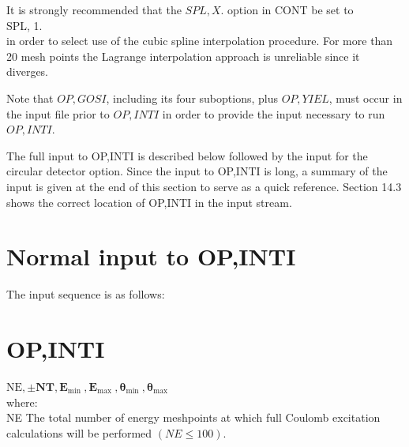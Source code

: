 \documentclass[10pt]{article}
\begin{document}
It is strongly recommended that the $S P L, X$. option in CONT be set to\\
SPL, 1.\\
in order to select use of the cubic spline interpolation procedure. For more than 20 mesh points the Lagrange interpolation approach is unreliable since it diverges.

Note that $O P, G O S I$, including its four suboptions, plus $O P, Y I E L$, must occur in the input file prior to $O P, I N T I$ in order to provide the input necessary to run $O P, I N T I$.

The full input to OP,INTI is described below followed by the input for the circular detector option. Since the input to OP,INTI is long, a summary of the input is given at the end of this section to serve as a quick reference. Section 14.3 shows the correct location of OP,INTI in the input stream.

\section*{Normal input to OP,INTI}
The input sequence is as follows:

\section*{OP,INTI}
$\mathrm{NE}, \pm \mathbf{N T}, \mathbf{E}_{\text {min }}, \mathbf{E}_{\text {max }}, \boldsymbol{\theta}_{\text {min }}, \boldsymbol{\theta}_{\max }$\\
where:\\
NE The total number of energy meshpoints at which full Coulomb excitation calculations will be performed $(N E \leq 100)$.
\end{document}
